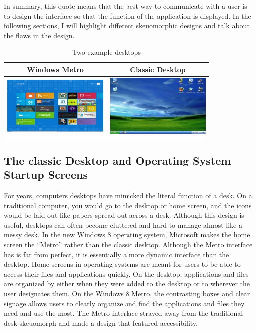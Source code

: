 \documentclass{article}
\begin{document}
In summary, this quote means that the best way to communicate with a user is to design the interface so that the function of the application is displayed. In the following sections, I will highlight different skeuomorphic designs and talk about the flaws in the design.

\begin{table}
\centering
\begin{tabular}{|c|c|}\hline
Windows Metro & Classic Desktop \\\hline\hline
\includegraphics[width = 2in]{metro.jpeg} & \includegraphics[width = 2in]{pc-desktop.jpeg} \\\hline
\end{tabular}

\caption{Two example desktops}
\label{desktops}
\end{table}

\subsection{The classic Desktop and Operating System Startup Screens}
	For years, computers desktops have mimicked the literal function of a desk. On a traditional computer, you would go to the desktop or home screen, and the icons would be laid out like papers spread out across a desk. Although this design is useful, desktops can often become cluttered and hard to manage almost like a messy desk. In the new Windows 8 operating system, Microsoft makes the home screen the “Metro” rather than the classic desktop. Although the Metro interface has is far from perfect, it is essentially a more dynamic interface than the desktop. Home screens in operating systems are meant for users to be able to access their files and applications quickly. On the desktop, applications and files are organized by either when they were added to the desktop or to wherever the user designates them. On the Windows 8 Metro, the contrasting boxes and clear signage allows users to clearly organize and find the applications and files they need and use the most. The Metro interface strayed away from the traditional desk skeuomorph and made a design that featured accessibility. 
\end{document}
